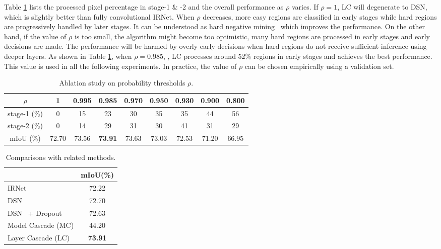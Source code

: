 \documentclass[10pt,twocolumn,letterpaper]{article}
\begin{document}
Table \ref{tab:ablation_threshold} lists the processed pixel percentage in stage-1 \& -2 and the overall performance as $\rho$ varies.
If $\rho = 1$, LC will degenerate to DSN, which is slightly better than fully convolutional IRNet.
When $\rho$ decreases, more easy regions are classified in early stages while hard regions are progressively handled by later stages.
It can be understood as hard negative mining~\cite{girshick2014rich, shrivastava2016training} which improves the performance.
On the other hand, if the value of $\rho$ is too small, the algorithm might become too optimistic, \ie many hard regions are processed in early stages and early decisions are made.
The performance will be harmed by overly early decisions when hard regions do not receive sufficient inference using deeper layers.
As shown in Table \ref{tab:ablation_threshold}, when $\rho = 0.985$, \ie, LC processes around 52\% regions in early stages and achieves the best performance. This value is used in all the following experiments.
In practice, the value of $\rho$ can be chosen empirically using a validation set.



\begin{table}
    \small
\caption{Ablation study on probability thresholds $\rho$.}
    \centering
    \begin{tabular}{@{}c@{ \,}|@{\,}c@{ \,}|@{\,}c@{ \,}|@{\,}c@{ \,}|@{\,}c@{ \,}|@{\,}c@{ \,}|@{\,}c@{ \,}|@{\,}c@{ \,}|@{\,}c@{ \,}}
        \hline
        $\rho$ & 1&0.995&0.985&0.970&0.950&0.930&0.900&0.800\\
        \hline\hline
        stage-1 (\%) & 0& 15&  23& 30& 35& 35& 44& 56\\
        stage-2 (\%) & 0& 14&  29& 31& 30& 41& 31& 29\\
        \hline
        mIoU (\%) &72.70&73.56& \textbf{73.91} & 73.63& 73.03&72.53&71.20&66.95\\
        \hline
    \end{tabular}
    \label{tab:ablation_threshold}
\end{table}

\begin{table}
    \small
    \caption{Comparisons with related methods.}
    \centering
    \begin{tabular}{l|c}
        \hline
        &mIoU(\%)\\
        \hline\hline
        IRNet~\cite{szegedy2016inception} & 72.22\\ 
        DSN~\cite{lee2015deeply} &72.70\\  
        DSN~\cite{lee2015deeply} + Dropout~\cite{srivastava2014dropout} & 72.63\\  
        Model Cascade (MC) & 44.20\\ 
        \hline\hline
        Layer Cascade (LC) & \textbf{73.91} \\
        \hline
    \end{tabular}
    \label{tab:related_methods}
\end{table}
\end{document}
